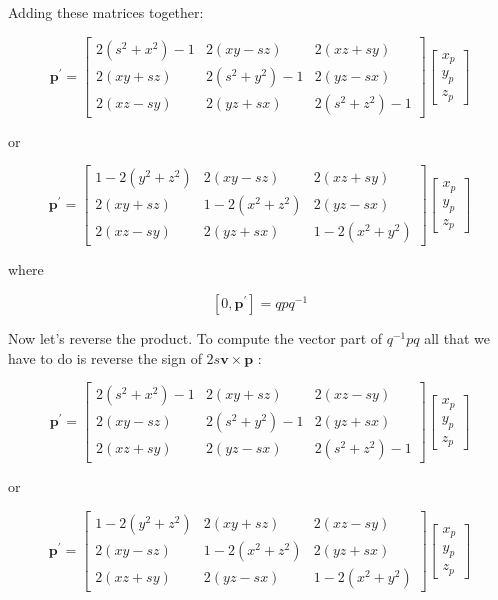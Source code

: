 \documentclass[10pt]{article}
\begin{document}
Adding these matrices together:

$$
\mathbf{p}^{\prime}=\left[\begin{array}{ccc}
2\left(s^{2}+x^{2}\right)-1 & 2(x y-s z) & 2(x z+s y) \\
2(x y+s z) & 2\left(s^{2}+y^{2}\right)-1 & 2(y z-s x) \\
2(x z-s y) & 2(y z+s x) & 2\left(s^{2}+z^{2}\right)-1
\end{array}\right]\left[\begin{array}{l}
x_{p} \\
y_{p} \\
z_{p}
\end{array}\right]
$$

or

$$
\mathbf{p}^{\prime}=\left[\begin{array}{ccc}
1-2\left(y^{2}+z^{2}\right) & 2(x y-s z) & 2(x z+s y) \\
2(x y+s z) & 1-2\left(x^{2}+z^{2}\right) & 2(y z-s x) \\
2(x z-s y) & 2(y z+s x) & 1-2\left(x^{2}+y^{2}\right)
\end{array}\right]\left[\begin{array}{l}
x_{p} \\
y_{p} \\
z_{p}
\end{array}\right]
$$

where

$$
\left[0, \mathbf{p}^{\prime}\right]=q p q^{-1}
$$

Now let's reverse the product. To compute the vector part of $q^{-1} p q$ all that we have to do is reverse the sign of $2 s \mathbf{v} \times \mathbf{p}$ :

$$
\mathbf{p}^{\prime}=\left[\begin{array}{ccc}
2\left(s^{2}+x^{2}\right)-1 & 2(x y+s z) & 2(x z-s y) \\
2(x y-s z) & 2\left(s^{2}+y^{2}\right)-1 & 2(y z+s x) \\
2(x z+s y) & 2(y z-s x) & 2\left(s^{2}+z^{2}\right)-1
\end{array}\right]\left[\begin{array}{c}
x_{p} \\
y_{p} \\
z_{p}
\end{array}\right]
$$

or

$$
\mathbf{p}^{\prime}=\left[\begin{array}{ccc}
1-2\left(y^{2}+z^{2}\right) & 2(x y+s z) & 2(x z-s y) \\
2(x y-s z) & 1-2\left(x^{2}+z^{2}\right) & 2(y z+s x) \\
2(x z+s y) & 2(y z-s x) & 1-2\left(x^{2}+y^{2}\right)
\end{array}\right]\left[\begin{array}{c}
x_{p} \\
y_{p} \\
z_{p}
\end{array}\right]
$$
\end{document}
